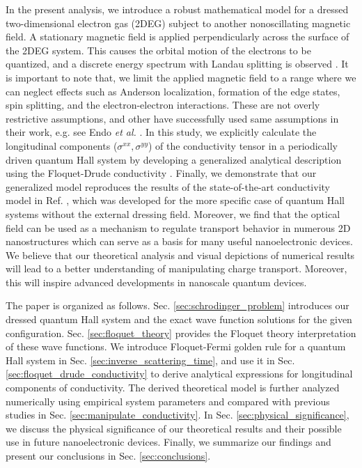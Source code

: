 \documentclass[
 reprint,
 amsmath,amssymb,
 aps,
 prb,
]{revtex4-2}
\begin{document}
In the present analysis, we introduce a robust mathematical model for a dressed two-dimensional electron gas (2DEG) subject to another nonoscillating magnetic field.
A stationary magnetic field is applied perpendicularly across the surface of the 2DEG system. This causes the orbital motion of the electrons to be quantized, and a discrete energy spectrum with Landau splitting is observed \cite{landau30}.
{\color{Red}
It is important to note that, we limit the applied magnetic field to a range where we can neglect effects such as Anderson localization, formation of the edge states, spin splitting, and the electron-electron interactions. These are not overly restrictive assumptions, and other have successfully used same assumptions in their work, e.g. see Endo \textit{et al.} \cite{endo09}.} In this study, we explicitly calculate the longitudinal components ($\sigma^{xx},\sigma^{yy}$) of the conductivity tensor in a periodically driven quantum Hall system by developing a generalized analytical description using the Floquet-Drude conductivity \cite{wackerl20}.
Finally, we demonstrate that our generalized model reproduces the results of the state-of-the-art conductivity model in Ref. \cite{endo09}, which was developed for the more specific case of quantum Hall systems without the external dressing field.
Moreover, we find that the optical field can be used as a mechanism to regulate transport behavior in numerous 2D nanostructures which can serve as a basis for many useful nanoelectronic devices. We believe that our theoretical analysis and visual depictions of numerical results will lead to a better understanding of manipulating charge transport. Moreover, this will inspire advanced  developments in nanoscale quantum devices.

The paper is organized as follows. Sec.  \ref{sec:schrodinger_problem} introduces our dressed quantum Hall system and the exact wave function solutions for the given configuration. Sec. \ref{sec:floquet_theory} provides the Floquet theory interpretation of these wave functions.
We introduce Floquet-Fermi golden rule for a quantum Hall system in Sec. \ref{sec:inverse_scattering_time}, and use it in Sec. \ref{sec:floquet_drude_conductivity} to derive analytical expressions for longitudinal components of conductivity.
The derived theoretical model is further analyzed numerically using empirical system parameters and compared with previous studies in Sec. \ref{sec:manipulate_conductivity}. {\color{Red}In Sec. \ref{sec:physical_significance}, we discuss the physical significance of our theoretical results and their possible use in future nanoelectronic devices.
Finally, we summarize our findings and present our conclusions in Sec. \ref{sec:conclusions}.}
\end{document}

